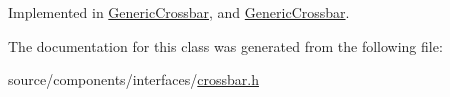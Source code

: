 Implemented in \hyperlink{classGenericCrossbar_5b9a2875ec8a1bb19683304ae31e3364}{GenericCrossbar}, and \hyperlink{classGenericCrossbar_5b9a2875ec8a1bb19683304ae31e3364}{GenericCrossbar}.

The documentation for this class was generated from the following file:\begin{CompactItemize}
\item 
source/components/interfaces/\hyperlink{crossbar_8h}{crossbar.h}\end{CompactItemize}
